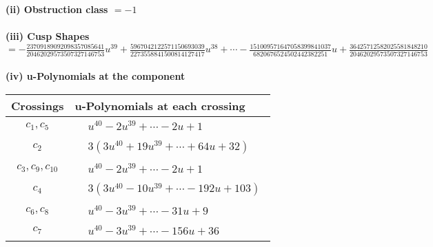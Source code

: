 \documentclass[1p]{elsarticle_modified}
\theoremstyle{definition}
\begin{document}
\flushleft \textbf{(ii) Obstruction class $= -1$}\\~\\
\flushleft \textbf{(iii) Cusp Shapes $= -\frac{23709189092098357085641}{20462029573507327146753} u^{39}+\frac{5967042122571150693039}{2273558841500814127417} u^{38}+\cdots-\frac{151009571647058399841037}{6820676524502442382251} u+\frac{36425712582025581848210}{20462029573507327146753}$}\\~\\
\newpage\renewcommand{\arraystretch}{1}
\flushleft \textbf{(iv) u-Polynomials at the component}\newline \\
\begin{tabular}{m{50pt}|m{274pt}}
Crossings & \hspace{64pt}u-Polynomials at each crossing \\
\hline $$\begin{aligned}c_{1},c_{5}\end{aligned}$$&$\begin{aligned}
&u^{40}-2 u^{39}+\cdots-2 u+1
\end{aligned}$\\
\hline $$\begin{aligned}c_{2}\end{aligned}$$&$\begin{aligned}
&3(3 u^{40}+19 u^{39}+\cdots+64 u+32)
\end{aligned}$\\
\hline $$\begin{aligned}c_{3},c_{9},c_{10}\end{aligned}$$&$\begin{aligned}
&u^{40}-2 u^{39}+\cdots-2 u+1
\end{aligned}$\\
\hline $$\begin{aligned}c_{4}\end{aligned}$$&$\begin{aligned}
&3(3 u^{40}-10 u^{39}+\cdots-192 u+103)
\end{aligned}$\\
\hline $$\begin{aligned}c_{6},c_{8}\end{aligned}$$&$\begin{aligned}
&u^{40}-3 u^{39}+\cdots-31 u+9
\end{aligned}$\\
\hline $$\begin{aligned}c_{7}\end{aligned}$$&$\begin{aligned}
&u^{40}-3 u^{39}+\cdots-156 u+36
\end{aligned}$\\
\hline
\end{tabular}\\~\\
\end{document}
